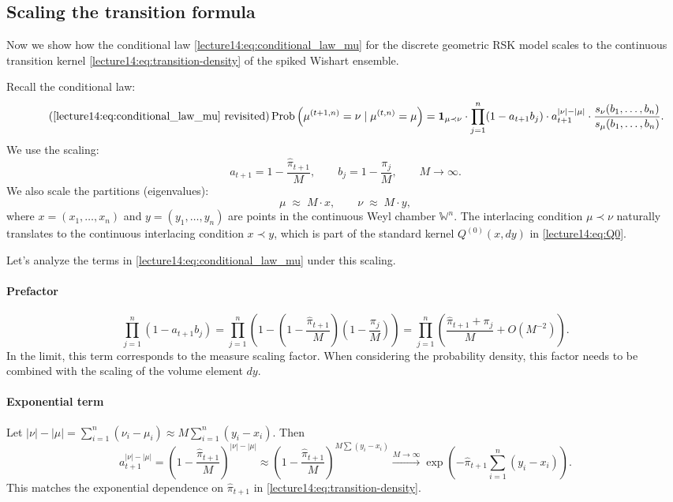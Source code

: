 \documentclass[letterpaper,11pt,oneside,reqno]{book}
\numberwithin{equation}{chapter}  %
\theoremstyle{definition}
\begin{document}
\subsection{Scaling the transition formula}

Now we show how the conditional law \eqref{lecture14:eq:conditional_law_mu} for the discrete geometric RSK model scales to the continuous transition kernel \eqref{lecture14:eq:transition-density} of the spiked Wishart ensemble.

Recall the conditional law:
\begin{equation}
	\tag{\ref{lecture14:eq:conditional_law_mu} revisited}
	\operatorname{Prob}\left( \mu^{(t+1,n)} = \nu \mid \mu^{(t,n)} = \mu \right) = \mathbf{1}_{\mu \prec \nu} \cdot \prod_{j=1}^n (1-a_{t+1}b_j) \cdot a_{t+1}^{|\nu|-|\mu|} \cdot \frac{s_{\nu}(b_1,\ldots,b_n)}{s_\mu(b_1,\ldots,b_n)}.
\end{equation}
We use the scaling:
\begin{equation*}
	a_{t+1}=1-\frac{\widehat\pi_{t+1}}{M}, \qquad b_j=1-\frac{\pi_j}{M},\qquad M\to\infty.
\end{equation*}
We also scale the partitions (eigenvalues):
\[
\mu \;\approx\; M\cdot x,\qquad \nu \;\approx\; M\cdot y,
\]
where $x=(x_1,\dots,x_n)$ and $y=(y_1,\dots,y_n)$ are points in the continuous Weyl chamber $\mathbb{W}^n$. The interlacing condition $\mu \prec \nu$ naturally translates to the continuous interlacing condition $x \prec y$, which is part of the standard kernel $Q^{(0)}(x, dy)$ in \eqref{lecture14:eq:Q0}.

Let's analyze the terms in \eqref{lecture14:eq:conditional_law_mu} under this scaling.

\paragraph{Prefactor}
\begin{equation*}
	\prod_{j=1}^n (1-a_{t+1}b_j) = \prod_{j=1}^n \left(1 - \left(1-\frac{\widehat\pi_{t+1}}{M}\right)\left(1-\frac{\pi_j}{M}\right)\right)
	= \prod_{j=1}^n \left( \frac{\widehat\pi_{t+1}+\pi_j}{M} + O(M^{-2}) \right).
\end{equation*}
In the limit, this term corresponds to the measure scaling factor. When considering the probability density, this factor needs to be combined with the scaling of the volume element $dy$.

\paragraph{Exponential term}
Let $|\nu|-|\mu| = \sum_{i=1}^n (\nu_i - \mu_i) \approx M \sum_{i=1}^n (y_i - x_i)$. Then
\begin{equation*}
	a_{t+1}^{|\nu|-|\mu|} = \left(1-\frac{\widehat\pi_{t+1}}{M}\right)^{|\nu|-|\mu|}
	\approx \left(1-\frac{\widehat\pi_{t+1}}{M}\right)^{M \sum (y_i-x_i)}
	\xrightarrow{M\to\infty} \exp\left(-\widehat\pi_{t+1} \sum_{i=1}^n (y_i - x_i)\right).
\end{equation*}
This matches the exponential dependence on $\widehat\pi_{t+1}$ in \eqref{lecture14:eq:transition-density}.
\end{document}
